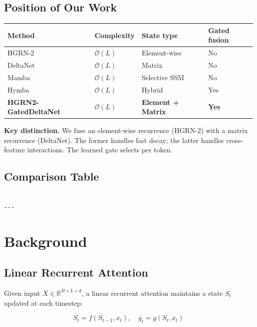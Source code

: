 \subsection{Position of Our Work}

\begin{table}[H]
\centering
\small
\begin{tabular}{llll}
\toprule
\textbf{Method} & \textbf{Complexity} & \textbf{State type} & \textbf{Gated fusion} \\
\midrule
HGRN-2 & $\mathcal{O}(L)$ & Element-wise & No \\
DeltaNet & $\mathcal{O}(L)$ & Matrix & No \\
Mamba & $\mathcal{O}(L)$ & Selective SSM & No \\
Hymba & $\mathcal{O}(L)$ & Hybrid & Yes \\
\textbf{HGRN2-GatedDeltaNet} & $\mathcal{O}(L)$ & \textbf{Element + Matrix} & \textbf{Yes} \\
\bottomrule
\end{tabular}
\end{table}

\textbf{Key distinction.} We fuse an element-wise recurrence (HGRN-2) with a 
matrix recurrence (DeltaNet). The former handles fast decay; the latter 
handles cross-feature interactions. The learned gate selects per token.



\subsection{Comparison Table}

\begin{lstlisting}

---
\end{lstlisting}

\section{Background}

\subsection{Linear Recurrent Attention}

Given input $X \in \mathbb{R}^{B \times L \times d}$, a linear recurrent 
attention maintains a state $S_t$ updated at each timestep:

\[
S_t = f(S_{t-1}, x_t), \quad
y_t = g(S_t, x_t)
\tag{3.1}
\]

